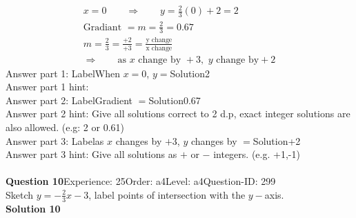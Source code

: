 \documentclass{article}
\begin{document}
\\[-35pt]\begin{align*}
&x=0\qquad\Rightarrow\qquad y=\displaystyle\frac{2}{3}(0)+2=2&\\[2pt]
&\text{Gradiant}\,\,=m=\displaystyle\frac{2}{3}=0.67&\\[2pt]
&m=\displaystyle\frac{2}{3}=\displaystyle\frac{+2}{+3}=\displaystyle\frac{\text{y change}}{\text{x change}}&\\[2pt]
& \Rightarrow\qquad \text{as}\,\, x \,\,\text{change by } +3,\,\, y\,\, \text{change by} +2 &
\end{align*}
Answer part 1: \hspace{10pt}Label\hspace{10pt}When $x=0$, $y=$\hspace{10pt}Solution\hspace{10pt}2\\
Answer part 1 hint: \hspace{15pt}\\
Answer part 2: \hspace{10pt}Label\hspace{10pt}Gradient $=$\hspace{10pt}Solution\hspace{10pt}0.67\\
Answer part 2 hint: \hspace{15pt}Give all solutions correct to 2 d.p, exact integer solutions are also allowed. (e.g: 2 or 0.61)\\
Answer part 3: \hspace{10pt}Label\hspace{10pt}as $x$ changes by $+3$, $y$ changes by $=$\hspace{10pt}Solution\hspace{10pt}+2\\
Answer part 3 hint: \hspace{15pt}Give all solutions as $+$ or $-$ integers. (e.g. +1,-1)\\
\\[4pt]
\noindent\textbf{Question 10}\hspace{20pt}Experience: 25\hspace{20pt}Order: a4\hspace{20pt}Level: a4\hspace{20pt}Question-ID: 299\\[2pt]
Sketch $y=-\displaystyle\frac{2}{3}x-3$, label points of intersection with the $y-$axis.\\[4pt]
\noindent\textbf{Solution 10}\\[2pt]
\end{document}

